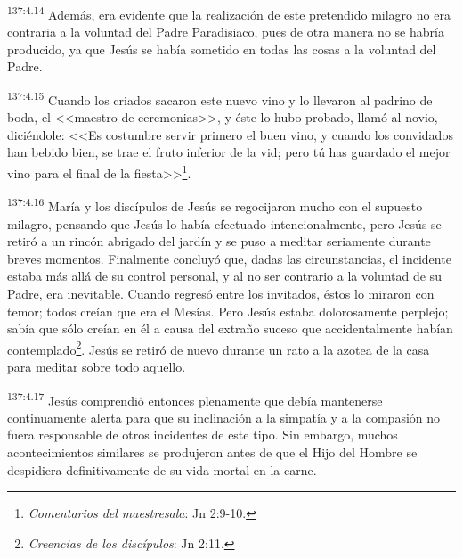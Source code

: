 \par 
\textsuperscript{137:4.14} Además, era evidente que la realización de este pretendido milagro no era contraria a la voluntad del Padre Paradisiaco, pues de otra manera no se habría producido, ya que Jesús se había sometido en todas las cosas a la voluntad del Padre.

\par 
\textsuperscript{137:4.15} Cuando los criados sacaron este nuevo vino y lo llevaron al padrino de boda, el <<maestro de ceremonias>>, y éste lo hubo probado, llamó al novio, diciéndole: <<Es costumbre servir primero el buen vino, y cuando los convidados han bebido bien, se trae el fruto inferior de la vid; pero tú has guardado el mejor vino para el final de la fiesta>>\footnote{\textit{Comentarios del maestresala}: Jn 2:9-10.}.

\par 
\textsuperscript{137:4.16} María y los discípulos de Jesús se regocijaron mucho con el supuesto milagro, pensando que Jesús lo había efectuado intencionalmente, pero Jesús se retiró a un rincón abrigado del jardín y se puso a meditar seriamente durante breves momentos. Finalmente concluyó que, dadas las circunstancias, el incidente estaba más allá de su control personal, y al no ser contrario a la voluntad de su Padre, era inevitable. Cuando regresó entre los invitados, éstos lo miraron con temor; todos creían que era el Mesías. Pero Jesús estaba dolorosamente perplejo; sabía que sólo creían en él a causa del extraño suceso que accidentalmente habían contemplado\footnote{\textit{Creencias de los discípulos}: Jn 2:11.}. Jesús se retiró de nuevo durante un rato a la azotea de la casa para meditar sobre todo aquello.

\par 
\textsuperscript{137:4.17} Jesús comprendió entonces plenamente que debía mantenerse continuamente alerta para que su inclinación a la simpatía y a la compasión no fuera responsable de otros incidentes de este tipo. Sin embargo, muchos acontecimientos similares se produjeron antes de que el Hijo del Hombre se despidiera definitivamente de su vida mortal en la carne.

